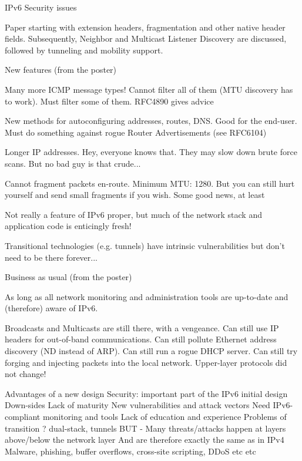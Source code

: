 IPv6 Security issues

Paper
starting with extension headers, fragmentation and other native header fields. Subsequently, Neighbor and Multicast Listener Discovery are discussed, followed by tunneling and mobility support.

New features (from the poster)

Many more ICMP message types! Cannot filter all of them (MTU discovery has to work). Must filter some of them. RFC4890 gives advice

New methods for autoconfiguring addresses, routes, DNS. Good for the end-user. Must do something against rogue Router Advertisements (see RFC6104)

Longer IP addresses. Hey, everyone knows that. They may slow down brute force scans. But no bad guy is that crude...

Cannot fragment packets en-route.  Minimum MTU: 1280. But you can still hurt yourself and send small fragments if you wish. Some good news, at least

Not really a feature of IPv6 proper, but much of the network stack and application code is enticingly fresh!

Transitional technologies (e.g. tunnels) have intrinsic vulnerabilities but don't need to be there forever...


Business as usual (from the poster)

As long as all network monitoring and administration tools are up-to-date and (therefore) aware of IPv6.

Broadcasts and Multicasts are still there, with a vengeance.
Can still use IP headers for out-of-band communications.
Can still pollute Ethernet address discovery (ND instead of ARP).
Can still run a rogue DHCP server.
Can still try forging and injecting packets into the local network. 
Upper-layer protocols did not change!


Advantages of a new design
Security: important part of the IPv6 initial design
Down-sides
Lack of maturity
New vulnerabilities and attack vectors
Need IPv6-compliant monitoring and tools
Lack of education and experience
Problems of transition ? dual-stack, tunnels
BUT - Many threats/attacks happen at layers above/below the network layer
And are therefore exactly the same as in IPv4
Malware, phishing, buffer overflows, cross-site scripting, DDoS etc etc
